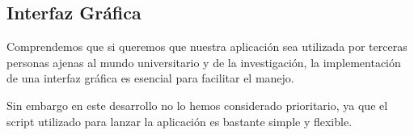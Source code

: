 \subsection{Interfaz Gráfica}

Comprendemos que si queremos que nuestra aplicación sea utilizada por terceras
personas ajenas al mundo universitario y de la investigación, la implementación
de una interfaz gráfica es esencial para facilitar el manejo.

Sin embargo en este desarrollo no lo hemos considerado prioritario, ya que
el script utilizado para lanzar la aplicación es bastante simple y flexible.

